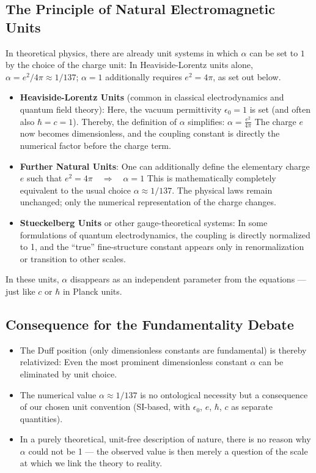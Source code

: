 	\subsection{The Principle of Natural Electromagnetic Units}
	In theoretical physics, there are already unit systems in which $\alpha$ can be set to $1$ by the choice of the charge unit: In Heaviside-Lorentz units alone, $\alpha = e^2/4\pi \approx 1/137$; $\alpha = 1$ additionally requires $e^2 = 4\pi$, as set out below.
	\begin{itemize}
		\item \textbf{Heaviside-Lorentz Units} (common in classical electrodynamics and quantum field theory):  
		Here, the vacuum permittivity $\epsilon_0 = 1$ is set (and often also $\hbar = c = 1$). Thereby, the definition of $\alpha$ simplifies:
		$\alpha = \frac{e^2}{4\pi}$
		The charge $e$ now becomes dimensionless, and the coupling constant is directly the numerical factor before the charge term.
		
		\item \textbf{Further Natural Units}:  
		One can additionally define the elementary charge $e$ such that
		$e^2 = 4\pi \quad \Rightarrow \quad \alpha = 1$
		This is mathematically completely equivalent to the usual choice $\alpha \approx 1/137$. The physical laws remain unchanged; only the numerical representation of the charge changes.
		
		\item \textbf{Stueckelberg Units} or other gauge-theoretical systems:  
		In some formulations of quantum electrodynamics, the coupling is directly normalized to 1, and the ``true'' fine-structure constant appears only in renormalization or transition to other scales.
	\end{itemize}
	
	In these units, $\alpha$ disappears as an independent parameter from the equations --- just like $c$ or $\hbar$ in Planck units.
	
	\subsection{Consequence for the Fundamentality Debate}
	\begin{itemize}
		\item The Duff position (only dimensionless constants are fundamental) is thereby relativized: Even the most prominent dimensionless constant $\alpha$ can be eliminated by unit choice.
		\item The numerical value $\alpha \approx 1/137$ is no ontological necessity but a consequence of our chosen unit convention (SI-based, with $\epsilon_0$, $e$, $\hbar$, $c$ as separate quantities).
		\item In a purely theoretical, unit-free description of nature, there is no reason why $\alpha$ could not be 1 --- the observed value is then merely a question of the scale at which we link the theory to reality.
	\end{itemize}
	
